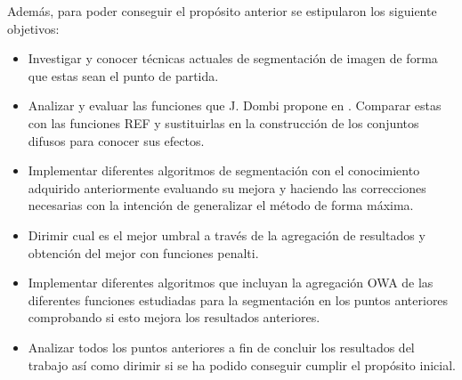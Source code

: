 Además, para poder conseguir el propósito anterior se estipularon los siguiente objetivos:
\begin{itemize}
	\item Investigar y conocer técnicas actuales de segmentación de imagen de forma que estas sean el punto de partida.
	\item Analizar y evaluar las funciones que J. Dombi propone en \cite{art:dombi}. Comparar estas con las funciones REF y sustituirlas en la construcción de los conjuntos difusos para conocer sus efectos.
	\item Implementar diferentes algoritmos de segmentación con el conocimiento adquirido anteriormente evaluando su mejora y haciendo las correcciones necesarias con la intención de generalizar el método de forma máxima.
	\item Dirimir cual es el mejor umbral a través de la agregación de resultados y obtención del mejor con funciones penalti.
	\item Implementar diferentes algoritmos que incluyan la agregación OWA de las diferentes funciones estudiadas para la segmentación en los puntos anteriores comprobando si esto mejora los resultados anteriores.
	\item Analizar todos los puntos anteriores a fin de concluir los resultados del trabajo así como dirimir si se ha podido conseguir cumplir el propósito inicial.
\end{itemize}
